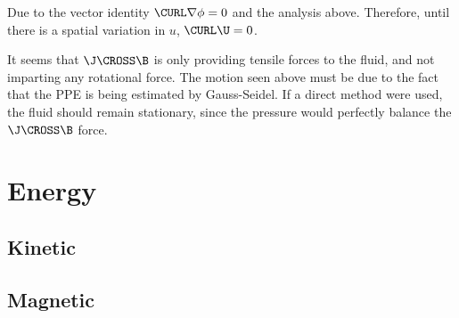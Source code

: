 \documentclass[11pt]{article}
\begin{document}
Due to the vector identity $\CURL \nabla \phi=0$ and the analysis above. Therefore, until there is a spatial variation in $u$, $\CURL \U=0$.

It seems that $\J \CROSS \B$ is only providing tensile forces to the fluid, and not imparting any rotational force. The motion seen above must be due to the fact that the PPE is being estimated by Gauss-Seidel. If a direct method were used, the fluid should remain stationary, since the pressure would perfectly balance the $\J \CROSS \B$ force.

\section{Energy}


\subsection{Kinetic}

\subsection{Magnetic}

\end{document}
